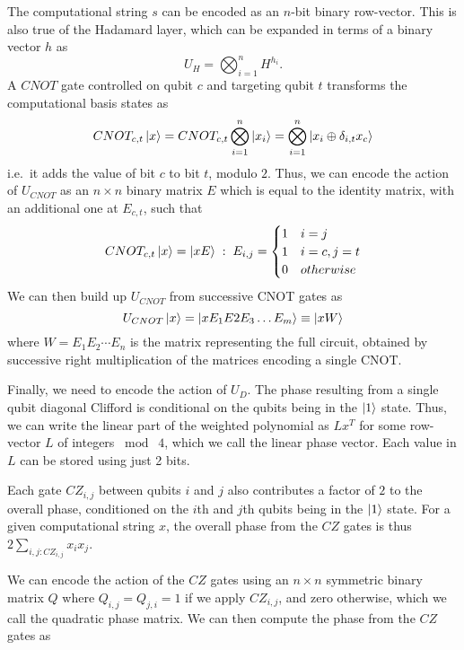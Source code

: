 The computational string $s$ can be encoded as an $n$-bit binary row-vector. This is also true of the Hadamard layer, which can be expanded in terms of a binary vector $h$ as
\begin{equation}
U_{H} = \bigotimes_{i=1}^{n} H^{h_{i}}.
\label{eq:binaryhad}
\end{equation}
A $CNOT$ gate controlled on qubit $c$ and targeting qubit $t$ transforms the computational basis states as
\[
CNOT_{c,t}\ket{x} = CNOT_{c,t}\bigotimes_{i=1}^{n}\ket{x_{i}} = \bigotimes_{i=1}^{n}\ket{x_{i}\oplus\delta_{i,t}x_{c}}
\]
i.e.~it adds the value of bit $c$ to bit $t$, modulo $2$. Thus, we can encode the action of $U_{CNOT}$ as an $n\times n$ binary matrix $E$ which is equal to the identity matrix, with an additional one at $E_{c,t}$, such that
\begin{equation}
CNOT_{c,t}\ket{x} = \ket{xE}\;:\; E_{i,j}=\begin{cases} 1 & i=j\\ 1 & i=c, j=t \\ 0 & otherwise \end{cases}
\label{eq:cnot_matrix}
\end{equation}
We can then build up $U_{CNOT}$ from successive CNOT gates as
\begin{equation}
U_{CNOT}\ket{x} = \ket{x E_{1}E{2}E_{3}\dots E_{m}} \equiv \ket{xW} \label{eq:cnot_matrices}
\end{equation}
where $W=E_{1}E_{2}\cdots E_{n}$ is the matrix representing the full circuit, obtained by successive right multiplication of the matrices encoding a single CNOT.\par
Finally, we need to encode the action of $U_{D}$. The phase resulting from a single qubit diagonal Clifford is conditional on the qubits being in the $\ket{1}$ state. Thus, we can write the linear part of the weighted polynomial as $Lx^{T}$ for some row-vector $L$ of integers $\bmod\;4$, which we call the linear phase vector. Each value in $L$ can be stored using just 2 bits.\par 
Each gate $CZ_{i,j}$ between qubits $i$ and $j$ also contributes a factor of $2$ to the overall phase, conditioned on the $i$th and $j$th qubits being in the $\ket{1}$ state. For a given computational string $x$, the overall phase from the $CZ$ gates is thus $2\sum_{i,j : CZ_{i,j}} x_{i}x_{j}$.\par
We can encode the action of the $CZ$ gates using an $n\times n$ symmetric binary matrix $Q$ where $Q_{i,j}=Q_{j,i}=1$ if we apply $CZ_{i,j}$, and zero otherwise, which we call the quadratic phase matrix. We can then compute the phase from the $CZ$ gates as
